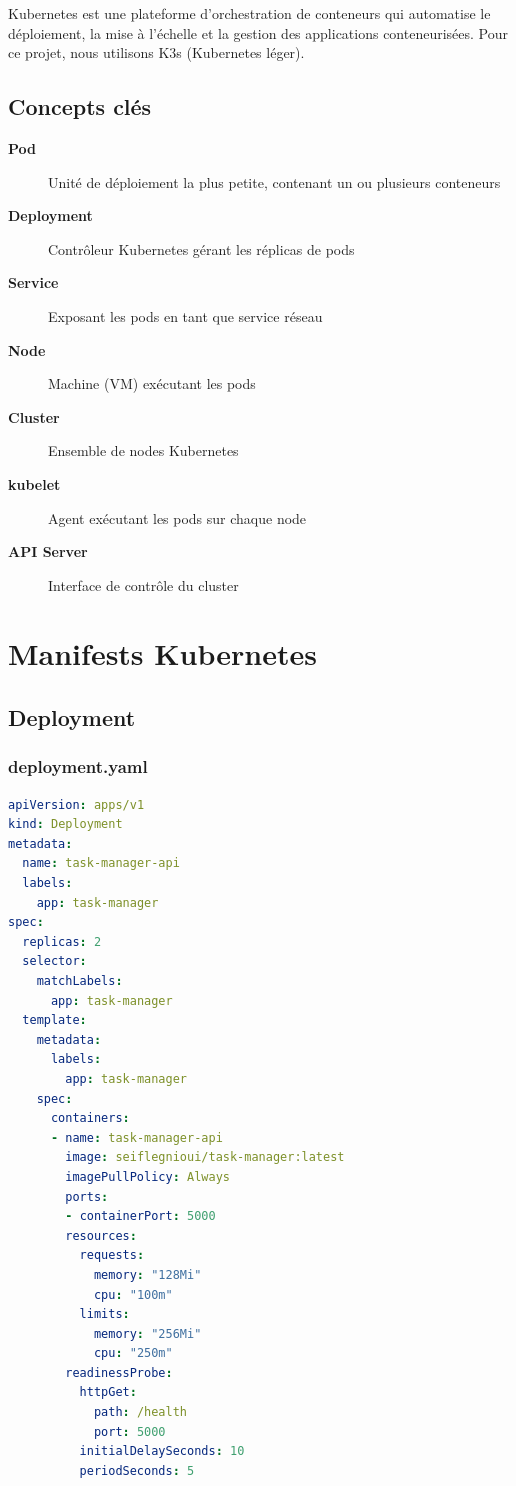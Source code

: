 \documentclass[12pt,a4paper,twoside]{report}
\begin{document}
Kubernetes est une plateforme d'orchestration de conteneurs qui automatise le déploiement, la mise à l'échelle et la gestion des applications conteneurisées. Pour ce projet, nous utilisons K3s (Kubernetes léger).

\subsection{Concepts clés}

\begin{description}
    \item[\textbf{Pod}] Unité de déploiement la plus petite, contenant un ou plusieurs conteneurs
    \item[\textbf{Deployment}] Contrôleur Kubernetes gérant les réplicas de pods
    \item[\textbf{Service}] Exposant les pods en tant que service réseau
    \item[\textbf{Node}] Machine (VM) exécutant les pods
    \item[\textbf{Cluster}] Ensemble de nodes Kubernetes
    \item[\textbf{kubelet}] Agent exécutant les pods sur chaque node
    \item[\textbf{API Server}] Interface de contrôle du cluster
\end{description}

\section{Manifests Kubernetes}

\subsection{Deployment}

\subsubsection{deployment.yaml}

\begin{lstlisting}[language=yaml]
apiVersion: apps/v1
kind: Deployment
metadata:
  name: task-manager-api
  labels:
    app: task-manager
spec:
  replicas: 2
  selector:
    matchLabels:
      app: task-manager
  template:
    metadata:
      labels:
        app: task-manager
    spec:
      containers:
      - name: task-manager-api
        image: seiflegnioui/task-manager:latest
        imagePullPolicy: Always
        ports:
        - containerPort: 5000
        resources:
          requests:
            memory: "128Mi"
            cpu: "100m"
          limits:
            memory: "256Mi"
            cpu: "250m"
        readinessProbe:
          httpGet:
            path: /health
            port: 5000
          initialDelaySeconds: 10
          periodSeconds: 5
\end{lstlisting}
\end{document}
